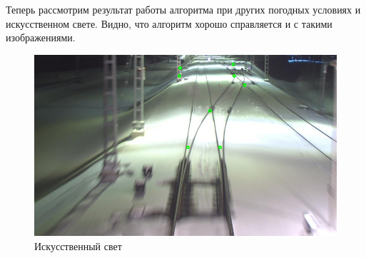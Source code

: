 Теперь рассмотрим результат работы алгоритма при других погодных условиях и искусственном свете. Видно, что алгоритм хорошо справляется и с такими изображениями.
\begin{figure}[!h]
	\centering
	\includegraphics[width=0.7\linewidth]{pictures/screenshot0017}
	\caption{Искусственный свет}
	\label{fig:res3}
\end{figure}

